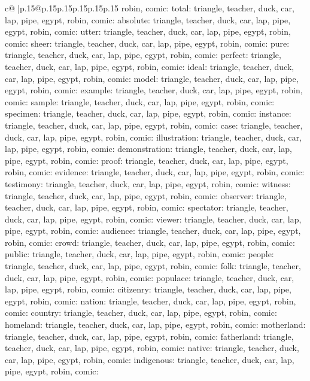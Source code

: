 \documentclass{article}
\begin{document}
{\begin{supertabular}{c@{$\;$}|p{.15\linewidth}@{}p{.15\linewidth}p{.15\linewidth}p{.15\linewidth}p{.15\linewidth}p{.15\linewidth}}
{{{robin, comic\n\nCLUE: total\nTARGETS: triangle, teacher, duck, car, lap, pipe, egypt, robin, comic\n\nCLUE: absolute\nTARGETS: triangle, teacher, duck, car, lap, pipe, egypt, robin, comic\n\nCLUE: utter\nTARGETS: triangle, teacher, duck, car, lap, pipe, egypt, robin, comic\n\nCLUE: sheer\nTARGETS: triangle, teacher, duck, car, lap, pipe, egypt, robin, comic\n\nCLUE: pure\nTARGETS: triangle, teacher, duck, car, lap, pipe, egypt, robin, comic\n\nCLUE: perfect\nTARGETS: triangle, teacher, duck, car, lap, pipe, egypt, robin, comic\n\nCLUE: ideal\nTARGETS: triangle, teacher, duck, car, lap, pipe, egypt, robin, comic\n\nCLUE: model\nTARGETS: triangle, teacher, duck, car, lap, pipe, egypt, robin, comic\n\nCLUE: example\nTARGETS: triangle, teacher, duck, car, lap, pipe, egypt, robin, comic\n\nCLUE: sample\nTARGETS: triangle, teacher, duck, car, lap, pipe, egypt, robin, comic\n\nCLUE: specimen\nTARGETS: triangle, teacher, duck, car, lap, pipe, egypt, robin, comic\n\nCLUE: instance\nTARGETS: triangle, teacher, duck, car, lap, pipe, egypt, robin, comic\n\nCLUE: case\nTARGETS: triangle, teacher, duck, car, lap, pipe, egypt, robin, comic\n\nCLUE: illustration\nTARGETS: triangle, teacher, duck, car, lap, pipe, egypt, robin, comic\n\nCLUE: demonstration\nTARGETS: triangle, teacher, duck, car, lap, pipe, egypt, robin, comic\n\nCLUE: proof\nTARGETS: triangle, teacher, duck, car, lap, pipe, egypt, robin, comic\n\nCLUE: evidence\nTARGETS: triangle, teacher, duck, car, lap, pipe, egypt, robin, comic\n\nCLUE: testimony\nTARGETS: triangle, teacher, duck, car, lap, pipe, egypt, robin, comic\n\nCLUE: witness\nTARGETS: triangle, teacher, duck, car, lap, pipe, egypt, robin, comic\n\nCLUE: observer\nTARGETS: triangle, teacher, duck, car, lap, pipe, egypt, robin, comic\n\nCLUE: spectator\nTARGETS: triangle, teacher, duck, car, lap, pipe, egypt, robin, comic\n\nCLUE: viewer\nTARGETS: triangle, teacher, duck, car, lap, pipe, egypt, robin, comic\n\nCLUE: audience\nTARGETS: triangle, teacher, duck, car, lap, pipe, egypt, robin, comic\n\nCLUE: crowd\nTARGETS: triangle, teacher, duck, car, lap, pipe, egypt, robin, comic\n\nCLUE: public\nTARGETS: triangle, teacher, duck, car, lap, pipe, egypt, robin, comic\n\nCLUE: people\nTARGETS: triangle, teacher, duck, car, lap, pipe, egypt, robin, comic\n\nCLUE: folk\nTARGETS: triangle, teacher, duck, car, lap, pipe, egypt, robin, comic\n\nCLUE: populace\nTARGETS: triangle, teacher, duck, car, lap, pipe, egypt, robin, comic\n\nCLUE: citizenry\nTARGETS: triangle, teacher, duck, car, lap, pipe, egypt, robin, comic\n\nCLUE: nation\nTARGETS: triangle, teacher, duck, car, lap, pipe, egypt, robin, comic\n\nCLUE: country\nTARGETS: triangle, teacher, duck, car, lap, pipe, egypt, robin, comic\n\nCLUE: homeland\nTARGETS: triangle, teacher, duck, car, lap, pipe, egypt, robin, comic\n\nCLUE: motherland\nTARGETS: triangle, teacher, duck, car, lap, pipe, egypt, robin, comic\n\nCLUE: fatherland\nTARGETS: triangle, teacher, duck, car, lap, pipe, egypt, robin, comic\n\nCLUE: native\nTARGETS: triangle, teacher, duck, car, lap, pipe, egypt, robin, comic\n\nCLUE: indigenous\nTARGETS: triangle, teacher, duck, car, lap, pipe, egypt, robin, comic\n\nCLUE: }}}
\end{supertabular}}
\end{document}
